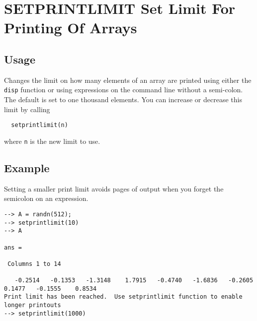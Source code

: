 \section{SETPRINTLIMIT Set Limit For Printing Of Arrays}

\subsection{Usage}

Changes the limit on how many elements of an array are printed
using either the \verb|disp| function or using expressions on the
command line without a semi-colon.  The default is set to 
one thousand elements.  You can increase or decrease this
limit by calling
\begin{verbatim}
  setprintlimit(n)
\end{verbatim}
where \verb|n| is the new limit to use.
\subsection{Example}

Setting a smaller print limit avoids pages of output when you forget the semicolon on an expression.
\begin{verbatim}
--> A = randn(512);
--> setprintlimit(10)
--> A

ans = 

 Columns 1 to 14

   -0.2514   -0.1353   -1.3148    1.7915   -0.4740   -1.6836   -0.2605    0.1477   -0.1555    0.8534
Print limit has been reached.  Use setprintlimit function to enable longer printouts
--> setprintlimit(1000)
\end{verbatim}
